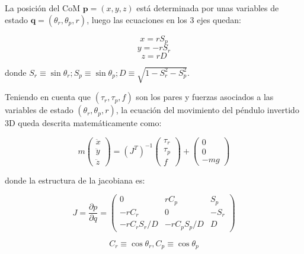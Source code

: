 La posición del CoM $\textbf{p}=(x,y,z)$ está determinada por unas variables de estado $\textbf{q}=(\theta_r,\theta_p,r)$, luego las ecuaciones en los 3 ejes quedan:

\begin{equation}
x=rS_p
\label{ec43}
\end{equation}
\begin{equation}
y=-rS_r
\label{ec44}
\end{equation}
\begin{equation}
z=rD
\label{ec45}
\end{equation}

donde $S_r \equiv \sin\theta_r; S_p \equiv \sin\theta_p; D \equiv \sqrt{1-S_r^{2}-S_p^{2}}$.

Teniendo en cuenta que $(\tau_r,\tau_p,f)$ son los pares y fuerzas asociados a las variables de estado $(\theta_r,\theta_p,r)$, la ecuación del movimiento del péndulo invertido 3D queda descrita matemáticamente como:

\begin{equation}
m\begin{pmatrix}
\ddot{x}\\ 
\ddot{y}\\ 
\ddot{z}
\end{pmatrix}=\left (J^{T} \right )^{-1}\begin{pmatrix}
\tau_r\\ 
\tau_p\\ 
f
\end{pmatrix}+\begin{pmatrix}
0\\ 
0\\ 
-mg
\end{pmatrix}
\label{ec46}
\end{equation}

donde la estructura de la jacobiana es:

\begin{equation}
J=\frac{\partial p}{\partial q}=\begin{pmatrix}
0 & rC_p & S_p\\ 
-rC_r & 0 & -S_r\\ 
-rC_rS_r/D &-rC_pS_p/D  & D
\end{pmatrix}
\label{ec47}
\end{equation}

\begin{equation}
C_r \equiv \cos\theta_r, C_p \equiv \cos\theta_p
\label{ec48}
\end{equation}

